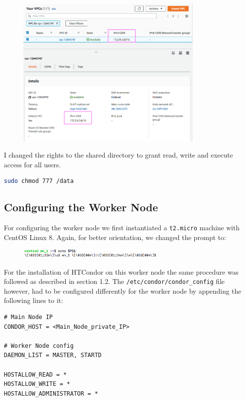 \documentclass{article}
\begin{document}
\begin{figure}[!h]
    \includegraphics[width=0.82\textwidth]{./img/ip_range.png}
\end{figure}

I changed the rights to the shared directory to grant read, write and execute access for all users.
\begin{lstlisting}[language=bash]
sudo chmod 777 /data
\end{lstlisting}

\subsection{Configuring the Worker Node}
For configuring the worker node we first instantiated a \texttt{t2.micro} machine with CentOS Linux 8\@. Again, for better orientation, we changed the prompt to:
\begin{figure}[!h]
    \includegraphics[width=0.65\textwidth]{./img/prompt_wn.png}
\end{figure}
\FloatBarrier%

For the installation of HTCondor on this worker node the same procedure was followed as described in section 1.2.
The \texttt{/etc/condor/condor\_config} file however, had to be configured differently for the worker node by appending the following lines to it:
\begin{lstlisting}
# Main Node IP
CONDOR_HOST = <Main_Node_private_IP>

# Worker Node config
DAEMON_LIST = MASTER, STARTD

HOSTALLOW_READ = *
HOSTALLOW_WRITE = *
HOSTALLOW_ADMINISTRATOR = *
\end{lstlisting}
\end{document}
